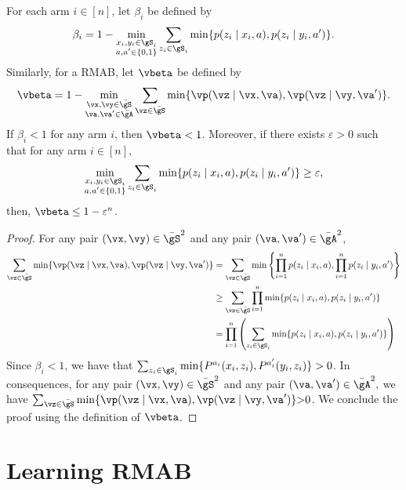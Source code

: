 \begin{thm}
    \label{thm:ergodicity_coeff} For each arm $i\in[n]$, let $\beta_i$ be defined by
    \begin{align*}
        \beta_i = 1-\min_{\substack{x_i,y_i\in\gS_i \\a,a'\in\{0,1\}}} \sum_{z_i\in\gS_i} \min\{p(z_i \mid x_i, a), p(z_i \mid y_i, a')\}.
    \end{align*}
    Similarly, for a RMAB, let $\vbeta$ be defined by
    \begin{align*}
        \vbeta = 1-\min_{\substack{\vx,\vy\in\bar{\gS} \\\va,\va'\in\bar{\gA}}} \sum_{\vz\in\bar{\gS}} \min\{\vp(\vz \mid \vx, \va), \vp(\vz \mid \vy, \va')\}.
    \end{align*}
    If $\beta_i<1$ for any arm $i$, then $\vbeta<1$.
    Moreover, if there exists $\varepsilon>0$ such that for any arm $i\in[n]$,
    \begin{align*}
        \min_{\substack{x_i,y_i\in\gS_i \\a,a'\in\{0,1\}}} \sum_{z_i\in\gS_i} \min\{p(z_i \mid x_i, a), p(z_i \mid y_i, a')\} \ge \varepsilon,
    \end{align*}
    then, $\vbeta\le 1-\varepsilon^n$.
\end{thm}
\begin{proof}
    For any pair $(\vx,\vy)\in\bar{\gS}^2$ and any pair $(\va,\va')\in\bar{\gA}^2$,
    \begin{align*}
        \sum_{\vz\in\bar{\gS}} \min\{\vp(\vz \mid \vx, \va), \vp(\vz \mid \vy, \va')\}
        &= \sum_{\vz\in\bar{\gS}} \min\left\{\prod_{i=1}^np(z_i \mid x_i, a), \prod_{i=1}^np(z_i \mid y_i, a')\right\} \\
        &\ge \sum_{\vz\in\bar{\gS}}\prod_{i=1}^n \min\{p(z_i \mid x_i, a), p(z_i \mid y_i, a')\} \\
        &= \prod_{i=1}^n \left(\sum_{z_i\in\gS_i} \min\{p(z_i \mid x_i, a), p(z_i \mid y_i, a')\}\right)
    \end{align*}
    Since $\beta_i<1$, we have that $\sum_{z_i\in\gS_i} \min\{P^{a_i}(x_i,z_i), P^{a_i'}(y_i,z_i)\}>0$.
    In consequences, for any pair $(\vx,\vy)\in\bar{\gS}^2$ and any pair $(\va,\va')\in\bar{\gA}^2,$ we have ${\sum_{\vz\in\bar{\gS}} \min\{\vp(\vz \mid \vx, \va), \vp(\vz \mid \vy, \va')\}{>}0}$.
    We conclude the proof using the definition of $\vbeta$.
\end{proof}


\section{Learning RMAB}

